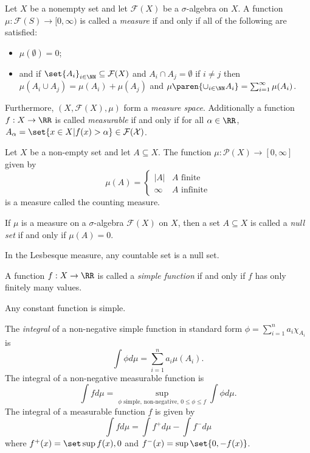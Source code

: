 \begin{definition*}
	Let $X$ be a nonempty set and let $\mathcal{F}(X)$ be a $\sigma$-algebra on $X$.
	A function $\mu:\mathcal{F}(S)\rightarrow [0,\infty)$ is called a \textit{measure} if and only if all of the following are satisfied:
	\begin{itemize}
		\item $\mu(\emptyset)=0$;
		\item and if $\set{A_i}_{i\in\NN}\subseteq\mathcal{F}(X)$ and $A_i\cap A_j=\emptyset$ if $i\neq j$ then $\mu(A_i\cup A_j)=\mu(A_i)+\mu(A_j)$ and $\mu\paren{\cup_{i\in\NN} A_i}=\sum_{i=1}^\infty \mu(A_i)$.
	\end{itemize}
	Furthermore, $(X,\mathcal{F}(X), \mu)$ form a \textit{measure space}.
	Additionally a function $f:X\rightarrow\RR$ is called \textit{measurable} if and only if for all $\alpha\in\RR$, $A_\alpha=\set{x\in X|f(x)>\alpha}\in\mathcal{F(X)}$.
\end{definition*}
\begin{example*}
	Let $X$ be a non-empty set and let $A\subseteq X$.
	The function $\mu:\mathcal{P}(X)\rightarrow[0,\infty]$ given by
	\[
	\mu(A)=\begin{cases}
	|A| & A\text{ finite}\\
	\infty &A\text{ infinite}
	\end{cases}
	\]
	is a measure called the counting measure.
\end{example*}

\begin{definition*}
	If $\mu$ is a measure on a $\sigma$-algebra $\mathcal{F}(X)$ on $X$, then a set $A\subseteq X$ is called a \textit{null set} if and only if $\mu(A)=0$.
\end{definition*}
\begin{example*}
	In the Lesbesque measure, any countable set is a null set.
\end{example*}

\begin{definition*}
	A function $f:X\rightarrow\RR$ is called a \textit{simple function} if and only if $f$ has only finitely many values.
\end{definition*}
\begin{example*}
	Any constant function is simple.
\end{example*}

\begin{definition*}
	The \textit{integral} of a non-negative simple function in standard form $\phi=\sum_{i=1}^n a_i\chi_{A_i}$ is
	\[
		\int\phi d\mu=\sum_{i=1}^n a_i\mu(A_i).
	\]
	The integral of a non-negative measurable function is
	\[
	\int fd\mu =\sup\limits_{\phi\text{ simple, non-negative, } 0\leq\phi\leq f} \int \phi d\mu.
	\]
	The integral of a measurable function $f$ is given by
	\[
	\int f d\mu = \int f^+d\mu -\int f^-d\mu
	\]
	where $f^+(x)=\set\sup{f(x),0}$ and $f^-(x)=\sup\set{0,-f(x)}$.
	
\end{definition*}

